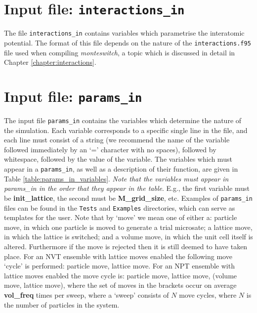 \documentclass{report}
\begin{document}
\section{Input file: \texttt{interactions\_in}}
The file \texttt{interactions\_in} contains variables which parametrise the interatomic potential. The format of this file depends on
the nature of the \texttt{interactions.f95} file used when compiling \emph{monteswitch}, a topic which is discussed in detail in Chapter
\ref{chapter:interactions}.

\section{Input file: \texttt{params\_in}}\label{section:params_in}
The input file \texttt{params\_in} contains the variables which determine the nature of the simulation. Each variable corresponds to a
specific single line in the file, and each line must consist of a string (we recommend the name of the variable followed immediately
by an `=' character with no spaces), followed by whitespace, followed by the value of the variable. The variables which must appear
in a \texttt{params\_in}, as well as a description of their function, are given in Table \ref{table:params_in_variables}. 
\emph{Note that the variables must appear in params\_in in the order that they appear in the table}. E.g., the first 
variable must be \textbf{init\_lattice}, the second must be \textbf{M\_grid\_size}, etc. Examples of \texttt{params\_in} files can
be found in the \texttt{Tests} and \texttt{Examples} directories, which can serve as templates for the user.
%
Note that by `move' we mean one of either a: particle move, in which one particle is moved to generate a trial microsate; a lattice move, in 
which the lattice is switched; and a volume move, in which the unit cell itself is altered. Furthermore if the move is rejected then it is 
still deemed to have taken place. For an NVT ensemble with lattice moves enabled the following move `cycle' is performed: particle move, 
lattice move. For an NPT ensemble with lattice moves enabled the move cycle is: particle move, lattice move, (volume move, lattice move), 
where the set of moves in the brackets occur on average \textbf{vol\_freq} times per sweep, where a `sweep' consists of $N$ move cycles,
where $N$ is the number of particles in the system.
\end{document}
